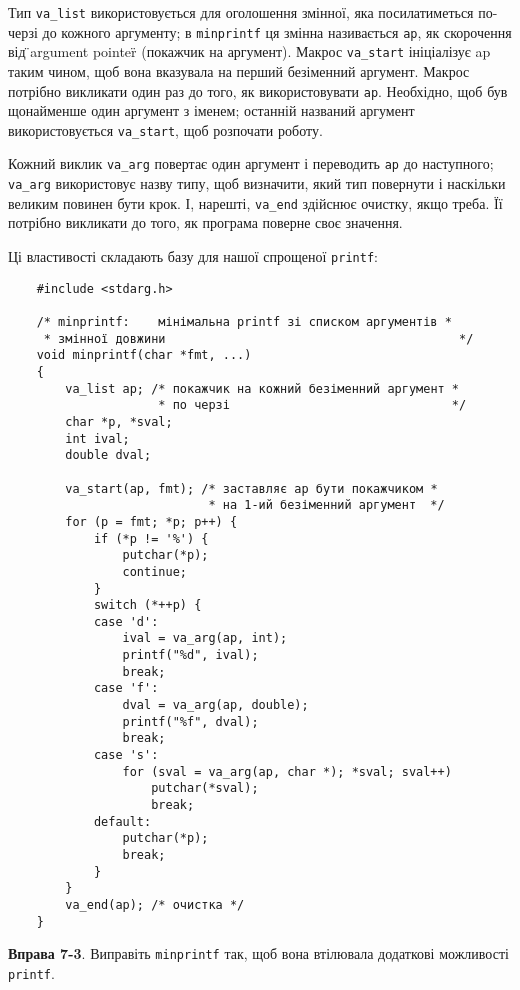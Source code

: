 \documentclass[a4paper,12pt]{book}
\begin{document}
  Тип \texttt{va\_list} використовується для оголошення змінної, яка посилатиметься
  по-черзі до кожного аргументу; в \texttt{minprintf} ця змінна називається \texttt{ap},
  як скорочення від \"{}argument pointer\"{} (покажчик на аргумент). Макрос
  \texttt{va\_start} ініціалізує ap таким чином, щоб вона вказувала на перший безіменний
  аргумент. Макрос потрібно викликати один раз до того, як використовувати \texttt{ap}.
  Необхідно, щоб був щонайменше один аргумент з іменем; останній названий аргумент
  використовується \texttt{va\_start}, щоб розпочати роботу.

  Кожний виклик \texttt{va\_arg} повертає один аргумент і переводить \texttt{ap} до
  наступного; \texttt{va\_arg} використовує назву типу, щоб визначити, який тип повернути і
  наскільки великим повинен бути крок. І, нарешті, \texttt{va\_end} здійснює очистку, якщо
  треба. Її потрібно викликати до того, як програма поверне своє значення.

  Ці властивості складають базу для нашої спрощеної \texttt{printf}:
  \begin{verbatim}
    #include <stdarg.h>

    /* minprintf:    мінімальна printf зі списком аргументів *
     * змінної довжини                                         */
    void minprintf(char *fmt, ...)
    {
        va_list ap; /* покажчик на кожний безіменний аргумент *
                     * по черзі                               */
        char *p, *sval;
        int ival;
        double dval;

        va_start(ap, fmt); /* заставляє ap бути покажчиком *
                            * на 1-ий безіменний аргумент  */
        for (p = fmt; *p; p++) {
            if (*p != '%') {
                putchar(*p);
                continue;
            }
            switch (*++p) {
            case 'd':
                ival = va_arg(ap, int);
                printf("%d", ival);
                break;
            case 'f':
                dval = va_arg(ap, double);
                printf("%f", dval);
                break;
            case 's':
                for (sval = va_arg(ap, char *); *sval; sval++)
                    putchar(*sval);
                    break;
            default:
                putchar(*p);
                break;
            }
        }
        va_end(ap); /* очистка */
    }
  \end{verbatim}

  \textbf{Вправа 7-3}. Виправіть \texttt{minprintf} так, щоб вона втілювала додаткові
  можливості \texttt{printf}.
\end{document}
